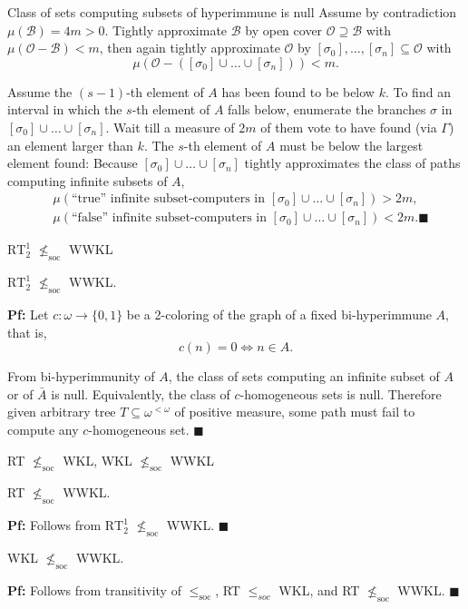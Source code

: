 \begin{frame}{Class of sets computing subsets of hyperimmune is null}
  Assume by contradiction $\mu(\mathcal{B})=4m>0$.  Tightly approximate
  $\mathcal{B}$ by open cover $\mathcal{O}\supseteq\mathcal{B}$ with
  $\mu(\mathcal{O}-\mathcal{B})<m$, then again tightly approximate
  $\mathcal{O}$ by $[\sigma_0],\ldots,[\sigma_n] \subseteq\mathcal{O}$ with
  \[\mu(\mathcal{O}-([\sigma_0]\cup\ldots\cup[\sigma_n])) <m.\]

  Assume the $(s-1)$-th element of $A$ has been found to be below $k$. To
  find an interval in which the $s$-th element of $A$ falls below,
  enumerate the branches $\sigma$ in $[\sigma_0]\cup\ldots\cup[\sigma_n]$.
  Wait till a measure of $2m$ of them vote to have found (via
  $\Gamma$) an element larger than $k$. The $s$-th element of
  $A$ must be below the largest element found: Because
  $[\sigma_0]\cup\ldots\cup[\sigma_n]$ tightly approximates the class of
  paths computing infinite subsets of $A$,
  \begin{align*}
    &\mu(\text{``true'' infinite subset-computers in }
    [\sigma_0]\cup\ldots\cup[\sigma_n])>2m,\\
    &\mu(\text{``false'' infinite subset-computers in }
    [\sigma_0]\cup\ldots\cup[\sigma_n])<2m. \blacksquare
  \end{align*}
\end{frame}

\begin{frame}{$\text{RT}_2^1$ $\nleq_{\text{soc}}$ WWKL}
  \begin{thm}
    $\text{RT}_2^1$ $\nleq_{\text{soc}}$ WWKL.
  \end{thm}

  \vspace{1em}
  \textbf{Pf:} Let $c:\omega\rightarrow\{0,1\}$ be a 2-coloring of the
  graph of a fixed bi-hyperimmune $A$, that is,
  \[c(n)=0 \Leftrightarrow n\in A.\]
  
  From bi-hyperimmunity of $A$, the class of sets computing an infinite
  subset of $A$ or of $\bar{A}$ is null. Equivalently, the class of
  $c$-homogeneous sets is null. Therefore given arbitrary tree
  $T\subseteq\omega^{<\omega}$ of positive measure, some path must fail to
  compute any $c$-homogeneous set. $\blacksquare$
\end{frame}

\begin{frame}{RT $\nleq_{\text{soc}}$ WKL, WKL $\nleq_{\text{soc}}$ WWKL}
  \begin{coro}
    \label{coro:rt-wwkl}
    RT $\nleq_{\text{soc}}$ WWKL.
  \end{coro}
  \textbf{Pf:} Follows from $\text{RT}_2^1$ $\nleq_{\text{soc}}$ WWKL.
  $\blacksquare$

  \vspace{2em}
  \begin{coro}
    WKL $\nleq_{\text{soc}}$ WWKL.
  \end{coro}
  \textbf{Pf:} Follows from transitivity of $\leq_\text{soc}$,
  RT $\leq_{soc}$ WKL, and RT $\nleq_{\text{soc}}$ WWKL. $\blacksquare$
\end{frame}
